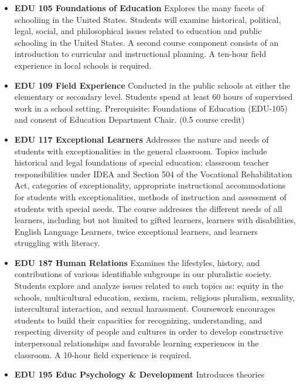 \documentclass[
  letterpaper,
]{scrbook}
\providecommand{\tightlist}{%
  \setlength{\itemsep}{0pt}\setlength{\parskip}{0pt}}
\begin{document}
\begin{itemize}
\tightlist
\item
  \textbf{EDU 105 Foundations of Education} Explores the many facets of
  schooliing in the United States. Students will examine historical,
  political, legal, social, and philosophical issues related to
  education and public schooling in the United States. A second course
  component consists of an introduction to curricular and instructional
  planning. A ten-hour field experience in local schools is required.\\
\item
  \textbf{EDU 109 Field Experience} Conducted in the public schools at
  either the elementary or secondary level. Students spend at least 60
  hours of supervised work in a school setting. Prerequisite:
  Foundations of Education (EDU-105) and consent of Education Department
  Chair. (0.5 course credit)\\
\item
  \textbf{EDU 117 Exceptional Learners} Addresses the nature and needs
  of students with exceptionalities in the general classroom. Topics
  include historical and legal foundations of special education;
  classroom teacher responsibilities under IDEA and Section 504 of the
  Vocational Rehabilitation Act, categories of exceptionality,
  appropriate instructional accommodations for students with
  exceptionalities, methods of instruction and assessment of students
  with special needs. The course addresses the different needs of all
  learners, including but not limited to gifted learners, learners with
  disabilities, English Language Learners, twice exceptional learners,
  and learners struggling with literacy.\\
\item
  \textbf{EDU 187 Human Relations} Examines the lifestyles, history, and
  contributions of various identifiable subgroups in our pluralistic
  society. Students explore and analyze issues related to such topics
  as: equity in the schools, multicultural education, sexism, racism,
  religious pluralism, sexuality, intercultural interaction, and sexual
  harassment. Coursework encourages students to build their capacities
  for recognizing, understanding, and respecting diversity of people and
  cultures in order to develop constructive interpersonal relationships
  and favorable learning experiences in the classroom. A 10-hour field
  experience is required.\\
\item
  \textbf{EDU 195 Educ Psychology \& Development} Introduces theories

\end{itemize}
\end{document}
